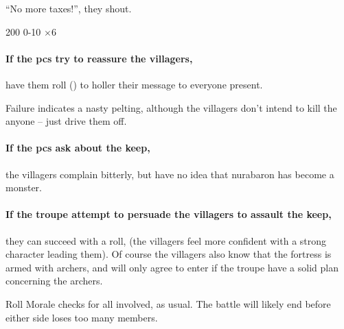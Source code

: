 \begin{multicols}{2}
\begin{boxtext}
  ``No more taxes!'', they shout.
\end{boxtext}

%
  {{2}{0}{0}}%
  {{0}{-1}{0}}%
  {%
    \Dagger
  }%
  {}%
  {\rock $\times 6$}%
  {}%

\paragraph{If the \glspl{pc} try to reassure the villagers,}
have them roll  (\tn[9]) to holler their message to everyone present.

Failure indicates a nasty pelting, although the villagers don't intend to kill the anyone -- just drive them off.

\paragraph{If the \glspl{pc} ask about the keep,}
the villagers complain bitterly, but have no idea that \gls{nurabaron} has become a monster.

\paragraph{If the troupe attempt to persuade the villagers to assault the keep,}
they can succeed with a  roll, \tn[10]
(the villagers feel more confident with a strong character leading them).
Of course the villagers also know that the fortress is armed with archers, and will only agree to enter if the troupe have a solid plan concerning the archers.

Roll Morale checks for all involved, as usual.%
The battle will likely end before either side loses too many members.



\end{multicols}
